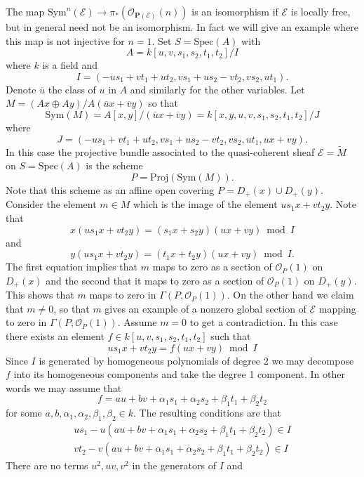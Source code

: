 \begin{example}
\label{example-projective-bundle}
The map $\text{Sym}^n(\mathcal{E}) \to
\pi_*(\mathcal{O}_{\mathbf{P}(\mathcal{E})}(n))$
is an isomorphism if $\mathcal{E}$ is locally free, but in general
need not be an isomorphism. In fact we will give an example where
this map is not injective for $n = 1$. Set $S = \text{Spec}(A)$ with
$$
A = k[u, v, s_1, s_2, t_1, t_2]/I
$$
where $k$ is a field and
$$
I = (-us_1 + vt_1 + ut_2, vs_1 + us_2 - vt_2, vs_2, ut_1).
$$
Denote $\overline{u}$ the class of $u$ in $A$ and similarly for
the other variables.
Let $M = (Ax \oplus Ay)/A(\overline{u}x + \overline{v}y)$ so that
$$
\text{Sym}(M) = A[x, y]/(\overline{u}x + \overline{v}y)
= k[x, y, u, v, s_1, s_2, t_1, t_2]/J
$$
where 
$$
J = (-us_1 + vt_1 + ut_2, vs_1 + us_2 - vt_2, vs_2, ut_1, ux + vy).
$$
In this case the projective bundle associated to the quasi-coherent
sheaf $\mathcal{E} = \widetilde{M}$ on $S = \text{Spec}(A)$ is the scheme
$$
P =
\text{Proj}(\text{Sym}(M)).
$$
Note that this scheme as an affine open covering
$P = D_{+}(x) \cup D_{+}(y)$.
Consider the element
$m \in M$ which is the image of the element
$us_1x + vt_2y$. Note that
$$
x(us_1x + vt_2y) = (s_1x + s_2y)(ux + vy) \bmod I
$$
and
$$
y(us_1x + vt_2y) = (t_1x + t_2y)(ux + vy) \bmod I.
$$
The first equation implies that $m$ maps to zero as a
section of $\mathcal{O}_P(1)$ on $D_{+}(x)$ and the second
that it maps to zero as a section of $\mathcal{O}_P(1)$ on $D_{+}(y)$.
This shows that $m$ maps to zero in $\Gamma(P, \mathcal{O}_P(1))$.
On the other hand we claim that $m \not = 0$, so that $m$ gives
an example of a nonzero global section of $\mathcal{E}$ mapping to zero
in $\Gamma(P, \mathcal{O}_P(1))$. Assume $m = 0$
to get a contradiction. In this case there exists
an element $f \in k[u, v, s_1, s_2, t_1, t_2]$ such that
$$
us_1x + vt_2y = f(ux + vy) \bmod I
$$
Since $I$ is generated by homogeneous polynomials of degree $2$ we
may decompose $f$ into its homogeneous components and take the
degree 1 component. In other words we may assume that
$$
f = au + bv + \alpha_1s_1 + \alpha_2s_2 + \beta_1t_1 + \beta_2t_2
$$
for some $a, b, \alpha_1, \alpha_2, \beta_1, \beta_2 \in k$.
The resulting conditions are that
$$
\begin{matrix}
us_1 - u(au + bv + \alpha_1s_1 + \alpha_2s_2 + \beta_1t_1 + \beta_2t_2)
\in I \\
vt_2 - v(au + bv + \alpha_1s_1 + \alpha_2s_2 + \beta_1t_1 + \beta_2t_2)
\in I
\end{matrix}
$$
There are no terms $u^2, uv, v^2$ in the generators of $I$ and

\end{example}
